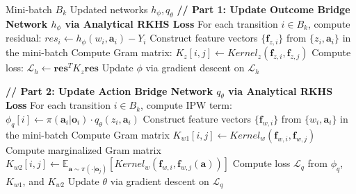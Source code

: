 \documentclass{article}
\begin{document}
\begin{algorithm}
\caption{Update Causal Networks (DR with RKHS Critics)}
\label{alg:causal-networks-dr-rkhs}
\begin{algorithmic}[1]
\Require Mini-batch $B_k$
\Ensure Updated networks $h_\phi, q_\theta$
\State \textbf{// Part 1: Update Outcome Bridge Network $h_\phi$ via Analytical RKHS Loss}
\State For each transition $i \in B_k$, compute residual: $res_i \leftarrow h_\phi(w_i, \mathbf{a}_i) - Y_i$
\State Construct feature vectors $\{\mathbf{f}_{z,i}\}$ from $\{z_i, \mathbf{a}_i\}$ in the mini-batch
\State Compute Gram matrix: $K_z[i,j] \leftarrow Kernel_z(\mathbf{f}_{z,i}, \mathbf{f}_{z,j})$
\State Compute loss: $\mathcal{L}_{h} \leftarrow \mathbf{res}^T K_z \mathbf{res}$
\State Update $\phi$ via gradient descent on $\mathcal{L}_{h}$

\Statex
\State \textbf{// Part 2: Update Action Bridge Network $q_\theta$ via Analytical RKHS Loss}
\State For each transition $i \in B_k$, compute IPW term: $\phi_q[i] \leftarrow \pi(\mathbf{a}_i|\mathbf{o}_i) \cdot q_\theta(z_i, \mathbf{a}_i)$
\State Construct feature vectors $\{\mathbf{f}_{w,i}\}$ from $\{w_i, \mathbf{a}_i\}$ in the mini-batch
\State Compute Gram matrix $K_{w1}[i,j] \leftarrow Kernel_w(\mathbf{f}_{w,i}, \mathbf{f}_{w,j})$
\State Compute marginalized Gram matrix $K_{w2}[i,j] \leftarrow \mathbb{E}_{\mathbf{a} \sim \pi(\cdot|\mathbf{o}_j)}[Kernel_w(\mathbf{f}_{w,i}, \mathbf{f}_{w,j}(\mathbf{a}))]$ 
\State Compute loss $\mathcal{L}_{q}$ from $\phi_q$, $K_{w1}$, and $K_{w2}$
\State Update $\theta$ via gradient descent on $\mathcal{L}_{q}$
\end{algorithmic}
\end{algorithm}
\end{document}
